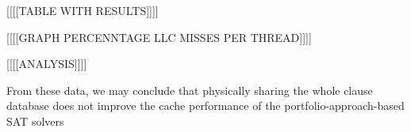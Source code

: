 [[[[TABLE WITH RESULTS]]]]

[[[[GRAPH PERCENNTAGE LLC MISSES PER THREAD]]]]

[[[[ANALYSIS]]]]

From these data, we may conclude that physically sharing the whole
clause database does not improve the cache performance of the
portfolio-approach-based SAT solvers


